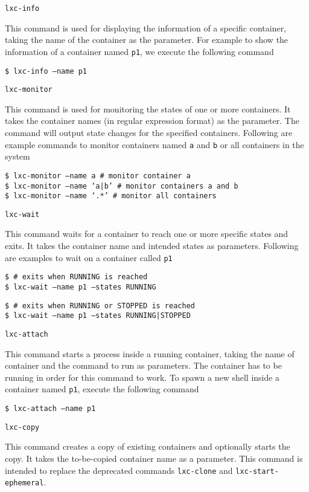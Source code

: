 \documentclass[12pt]{article}
\begin{document}
{\texttt{lxc-info}
\begin{dent}
This command is used for displaying the information of a specific container, taking the name of the container as the parameter. For example to show the information of a container named \texttt{p1}, we execute the following command

\texttt{\$ lxc-info --name p1}
\end{dent}


\texttt{lxc-monitor}
\begin{dent}
This command is used for monitoring the states of one or more containers. It takes the container names (in regular expression format) as the parameter. The command will output state changes for the specified containers. Following are example commands to monitor containers named \texttt{a} and \texttt{b} or all containers in the system

\texttt{\$ lxc-monitor --name a \# monitor container a}\\
\texttt{\$ lxc-monitor --name `a|b' \# monitor containers a and b}\\
\texttt{\$ lxc-monitor --name `.*' \# monitor all containers}
\end{dent}


\texttt{lxc-wait}
\begin{dent}
This command waits for a container to reach one or more specific states and exits. It takes the container name and intended states as parameters. Following are examples to wait on a container called \texttt{p1}

\texttt{\$ \# exits when RUNNING is reached}\\
\texttt{\$ lxc-wait --name p1 --states RUNNING}

\texttt{\$ \# exits when RUNNING or STOPPED is reached}\\
\texttt{\$ lxc-wait --name p1 --states RUNNING|STOPPED}
\end{dent}


\texttt{lxc-attach}
\begin{dent}
This command starts a process inside a running container, taking the name of container and the command to run as parameters. The container has to be running in order for this command to work. To spawn a new shell inside a container named \texttt{p1}, execute the following command

\texttt{\$ lxc-attach --name p1}
\end{dent}


\texttt{lxc-copy}
\begin{dent}
This command creates a copy of existing containers and optionally starts the copy. It takes the to-be-copied container name as a parameter. This command is intended to replace the deprecated commands \texttt{lxc-clone} and \texttt{lxc-start-ephemeral}.
\end{dent}
} %
\end{document}
